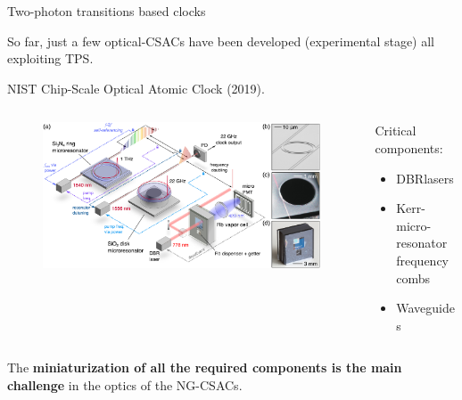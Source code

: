 \begin{frame}{Two-photon transitions based clocks}

    So far, just a few optical-CSACs have been developed (experimental stage) all exploiting TPS.

    \vspace{10pt}

    NIST Chip-Scale Optical Atomic Clock (2019).

    \begin{columns}[c, onlytextwidth]

        \begin{column}{0.65\textwidth}

            \begin{figure}
                \centering
                \includegraphics[width=\textwidth]{img/NIST-optical.jpeg}
            \end{figure}

        \end{column}

        \hfill

        \begin{column}{0.32\textwidth}

            Critical components:

            \begin{itemize}
                \item DBR\footnotemark[1] lasers
                \item Kerr-micro-resonator frequency combs
                \item Waveguides
            \end{itemize}

        \end{column}

    \end{columns}

    \vspace{10pt}

    The \textbf{miniaturization of all the required components is the main challenge} in the optics of the NG-CSACs.


\end{frame}



